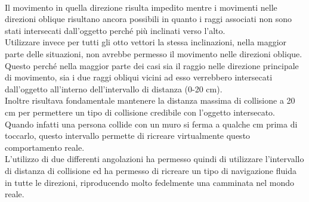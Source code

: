 \\
Il movimento in quella direzione risulta impedito mentre i movimenti nelle direzioni oblique risultano ancora possibili in quanto i raggi associati non sono stati intersecati dall’oggetto perché più inclinati verso l’alto.
\\
Utilizzare invece per tutti gli otto vettori la stessa inclinazioni, nella maggior parte delle situazioni, non avrebbe permesso il movimento nelle direzioni oblique. 
Questo perché nella maggior parte dei casi sia il raggio nelle direzione principale di movimento, sia i due raggi obliqui vicini ad esso verrebbero intersecati dall’oggetto all’interno dell’intervallo di distanza (0-20 cm).
\\
Inoltre risultava fondamentale mantenere la distanza massima di collisione a 20 cm per permettere un tipo di collisione credibile con l’oggetto intersecato. Quando infatti una persona collide con un muro si ferma a qualche cm prima di toccarlo, questo intervallo permette di ricreare virtualmente questo comportamento reale.
\\
L’utilizzo di due differenti angolazioni ha permesso quindi di utilizzare l’intervallo di distanza di collisione ed ha permesso di ricreare un tipo di navigazione fluida in tutte le direzioni, riproducendo molto fedelmente una camminata nel mondo reale.
\\

